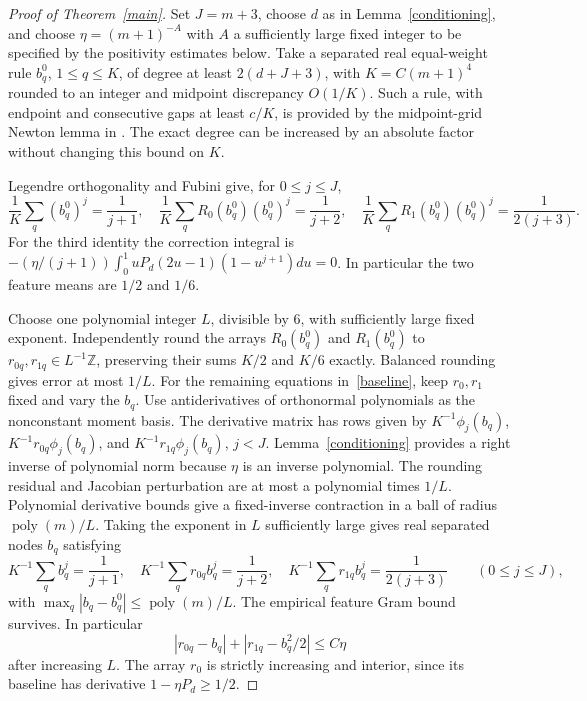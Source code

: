 \documentclass[11pt]{article}
\begin{document}
\begin{proof}[Proof of Theorem~\ref{main}]
Set $J=m+3$, choose $d$ as in Lemma~\ref{conditioning}, and choose
$\eta=(m+1)^{-A}$ with $A$ a sufficiently large fixed integer to be
specified by the positivity estimates below. Take a separated real
equal-weight rule $b_q^0$, $1\le q\le K$, of degree at least
$2(d+J+3)$, with $K=C(m+1)^4$ rounded to an integer and midpoint
discrepancy $O(1/K)$. Such a rule, with endpoint and consecutive gaps
at least $c/K$, is provided by the midpoint-grid Newton lemma in
.
The exact degree can be increased by an absolute factor without changing
this bound on $K$.

Legendre orthogonality and Fubini give, for $0\le j\le J$,
\begin{equation}\label{baseline}
 \frac1K\sum_q(b_q^0)^j=\frac1{j+1},\quad
 \frac1K\sum_qR_0(b_q^0)(b_q^0)^j=\frac1{j+2},\quad
 \frac1K\sum_qR_1(b_q^0)(b_q^0)^j=\frac1{2(j+3)}.
\end{equation}
For the third identity the correction integral is
$-(\eta/(j+1))\int_0^1uP_d(2u-1)(1-u^{j+1})du=0$.
In particular the two feature means are $1/2$ and $1/6$.

Choose one polynomial integer $L$, divisible by $6$, with sufficiently
large fixed exponent. Independently round the arrays $R_0(b_q^0)$ and
$R_1(b_q^0)$ to $r_{0q},r_{1q}\in L^{-1}\mathbb Z$, preserving their
sums $K/2$ and $K/6$ exactly. Balanced rounding gives error at most $1/L$.
For the remaining equations in~\eqref{baseline}, keep $r_0,r_1$ fixed
and vary the $b_q$. Use antiderivatives of orthonormal polynomials as
the nonconstant moment basis. The derivative matrix has rows given by
$K^{-1}\phi_j(b_q)$, $K^{-1}r_{0q}\phi_j(b_q)$, and
$K^{-1}r_{1q}\phi_j(b_q)$, $j<J$.
Lemma~\ref{conditioning} provides a right inverse of polynomial norm
because $\eta$ is an inverse polynomial. The rounding residual and
Jacobian perturbation are at most a polynomial times $1/L$.
Polynomial derivative bounds give a fixed-inverse contraction in a
ball of radius $\operatorname{poly}(m)/L$. Taking the exponent in $L$
sufficiently large gives real separated nodes $b_q$ satisfying
\begin{equation}\label{ranks}
 K^{-1}\sum_q b_q^j=\frac1{j+1},\quad
 K^{-1}\sum_q r_{0q}b_q^j=\frac1{j+2},\quad
 K^{-1}\sum_q r_{1q}b_q^j=\frac1{2(j+3)}
 \qquad(0\le j\le J),
\end{equation}
with $\max_q|b_q-b_q^0|\le\operatorname{poly}(m)/L$.
The empirical feature Gram bound survives. In particular
\[
 |r_{0q}-b_q|+|r_{1q}-b_q^2/2|\le C\eta
\]
after increasing $L$. The array $r_0$ is strictly increasing and
interior, since its baseline has derivative $1-\eta P_d\ge1/2$.


\end{proof}
\end{document}

